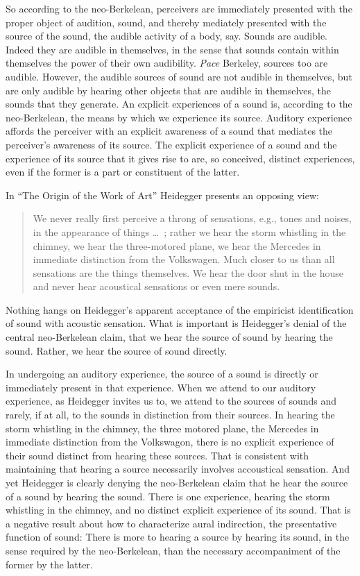 So according to the neo-Berkelean, perceivers are immediately presented with the proper object of audition, sound, and thereby mediately presented with the source of the sound, the audible activity of a body, say. Sounds are audible. Indeed they are audible in themselves, in the sense that sounds contain within themselves the power of their own audibility. \emph{Pace} Berkeley, sources too are audible. However, the audible sources of sound are not audible in themselves, but are only audible by hearing other objects that are audible in themselves, the sounds that they generate. An explicit experiences of a sound is, according to the neo-Berkelean, the means by which we experience its source.  Auditory experience affords the perceiver with an explicit awareness of a sound that mediates the perceiver's awareness of its source. The explicit experience of a sound and the experience of its source that it gives rise to are, so conceived, distinct experiences, even if the former is a part or constituent of the latter.

In ``The Origin of the Work of Art'' Heidegger presents an opposing view:
\begin{quote}
    We never really first perceive a throng of sensations, e.g., tones and noises, in the appearance of things \ldots\ ; rather we hear the storm whistling in the chimney, we hear the three-motored plane, we hear the Mercedes in immediate distinction from the Volkswagen. Much closer to us than all sensations are the things themselves. We hear the door shut in the house and never hear acoustical sensations or even mere sounds. \citep[151--152]{Heidegger:1935uq}
\end{quote}
Nothing hangs on Heidegger's apparent acceptance of the empiricist identification of sound with acoustic sensation. What is important is Heidegger's denial of the central neo-Berkelean claim, that we hear the source of sound by hearing the sound. Rather, we hear the source of sound directly.

In undergoing an auditory experience, the source of a sound is directly or immediately present in that experience. When we attend to our auditory experience, as Heidegger invites us to, we attend to the sources of sounds and rarely, if at all, to the sounds in distinction from their sources. In hearing the storm whistling in the chimney, the three motored plane, the Mercedes in immediate distinction from the Volkswagon, there is no explicit experience of their sound distinct from hearing these sources. That is consistent with maintaining that hearing a source necessarily involves accoustical sensation. And yet Heidegger is clearly denying the neo-Berkelean claim that he hear the source of a sound by hearing the sound. There is one experience, hearing the storm whistling in the chimney, and no distinct explicit experience of its sound. That is a negative result about how to characterize aural indirection, the presentative function of sound: There is more to hearing a source by hearing its sound, in the sense required by the neo-Berkelean, than the necessary accompaniment of the former by the latter.

